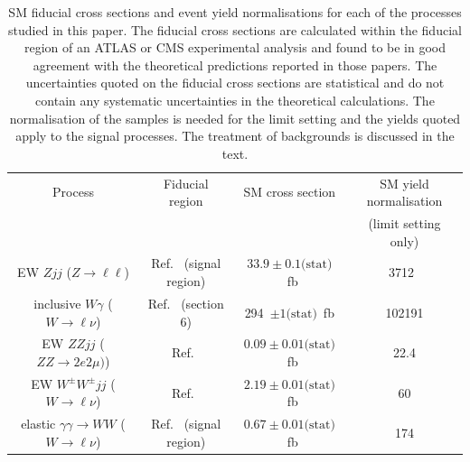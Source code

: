 \documentclass[twocolumn,preprintnumbers,superscriptaddress,nofootinbib,aps,prd,floatfix]{revtex4}
\begin{document}
\begin{table}[t!]
    \centering
    \begin{tabular}{|c|c|c|c|}
    \hline 
     Process & Fiducial region & SM cross section & SM yield normalisation \\
     & & & (limit setting only)\\
     \hline 
       EW $Zjj$ ($Z \rightarrow \ell \ell$) & Ref.~\cite{ATLAS:2020nzk} (signal region) & $33.9 \pm 0.1 \textrm{(stat)}$~fb & 3712~\cite{ATLAS:2020nzk}  \\
       inclusive $W\gamma$ ($W\rightarrow \ell \nu$) & Ref.~\cite{CMS:2021cxr} (section 6) & 294~$\pm 1 \textrm{(stat)}$~fb & 102191 \cite{CMS:2021cxr} \\
       EW $ZZjj$ ($ZZ\rightarrow 2e 2\mu)$) &  Ref.~\cite{ATLAS:2020nlt} & $0.09 \pm 0.01 \textrm{(stat)}$~fb & 22.4 \cite{ATLAS:2020nlt} \\
       EW $W^\pm W^\pm jj$ ($W\rightarrow \ell \nu$) & Ref.~\cite{ATLAS:2019cbr} & $2.19 \pm 0.01 \textrm{(stat)}$~fb & 60 \cite{ATLAS:2019cbr}\\
       elastic $\gamma \gamma \rightarrow WW$ ($W\rightarrow \ell \nu$) & Ref.~\cite{ATLAS:2020iwi} (signal region) & $0.67 \pm 0.01 \textrm{(stat)}$~fb & 174 \cite{ATLAS:2020iwi} \\
    \hline   
    \end{tabular}
    \caption{SM fiducial cross sections and event yield normalisations for each of the processes studied in this paper. The fiducial cross sections are calculated within the fiducial region of an ATLAS or CMS experimental analysis and found to be in good agreement with the theoretical predictions reported in those papers. The uncertainties quoted on the fiducial cross sections are statistical and do not contain any systematic uncertainties in the theoretical calculations. The normalisation of the samples is needed for the limit setting and the yields quoted apply to the signal processes. The treatment of backgrounds is discussed in the text.
    \label{tab:fiducialregions}}
\end{table}
\end{document}
